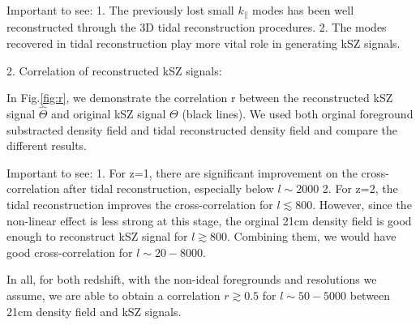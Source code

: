 Important to see: 
1. The previously lost small $k_\parallel$ modes has been well reconstructed through the 3D tidal reconstruction procedures. 
2. The modes recovered in tidal reconstruction play more vital role in generating kSZ signals. 

2. Correlation of reconstructed kSZ signals:

In Fig.\ref{fig:r}, 
we demonstrate the correlation r between the reconstructed kSZ signal $\hat \Theta$ and original kSZ signal $\Theta$ (black lines). 
We used both orginal foreground substracted density field and tidal reconstructed density field and compare the different results. 

Important to see:
1. For z=1, there are significant improvement on the cross-correlation after tidal reconstruction, especially below $l\sim 2000$
2. For z=2, the tidal reconstruction improves the cross-correlation for $l\lesssim 800$. 
However, since the non-linear effect is less strong at this stage, 
the orginal 21cm density field is good enough to reconstruct kSZ signal for $l \gtrsim 800$. 
Combining them, we would have good cross-correlation for $l \sim 20-8000$.

In all, for both redshift, with the non-ideal foregrounds and resolutions we assume, 
we are able to obtain a correlation $r \gtrsim 0.5$ for $l\sim 50-5000$ between 21cm density field and kSZ signals.

